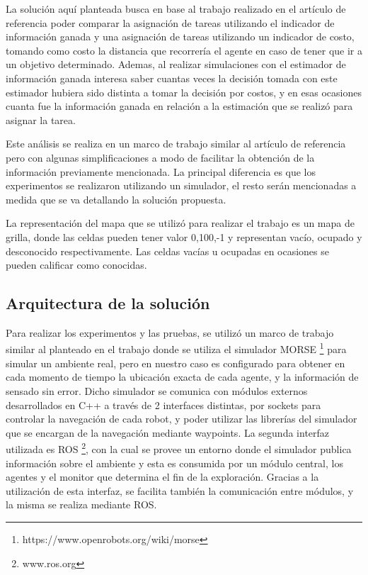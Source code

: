 \documentclass[runningheads]{llncs}
\begin{document}
La solución aquí planteada busca en base al trabajo realizado en el artículo de referencia poder comparar la asignación de tareas utilizando el indicador de información ganada y una asignación de tareas utilizando un indicador de costo, tomando como costo la distancia que recorrería el agente en caso de tener que ir a un objetivo determinado. Ademas, al realizar simulaciones con el estimador de información ganada interesa saber cuantas veces la decisión tomada con este estimador hubiera sido distinta a tomar la decisión por costos, y en esas ocasiones cuanta fue la información ganada en relación a la estimación que se realizó para asignar la tarea.

Este análisis se realiza en un marco de trabajo similar al artículo de referencia pero con algunas simplificaciones a modo de facilitar la obtención de la información previamente mencionada. La principal diferencia es que los experimentos se realizaron utilizando un simulador, el resto serán mencionadas a medida que se va detallando la solución propuesta.

La representación del mapa que se utilizó para realizar el trabajo es un mapa de grilla, donde las celdas pueden tener valor 0,100,-1 y representan vacío, ocupado y desconocido respectivamente. Las celdas vacías u ocupadas en ocasiones se pueden calificar como conocidas.

\subsection{Arquitectura de la solución}

Para realizar los experimentos y las pruebas, se utilizó un marco de trabajo similar al planteado en el trabajo \cite{metricas} donde se utiliza el simulador MORSE \footnote{https://www.openrobots.org/wiki/morse} para simular un ambiente real, pero en nuestro caso es configurado para obtener en cada momento de tiempo la ubicación exacta de cada agente, y la información de sensado sin error. Dicho simulador se comunica con módulos externos desarrollados en C++ a través de 2 interfaces distintas, por sockets para controlar la navegación de cada robot, y poder utilizar las librerías del simulador que se encargan de la navegación mediante waypoints. La segunda interfaz utilizada es ROS \footnote{www.ros.org}, con la cual se provee un entorno donde el simulador publica información sobre el ambiente y esta es consumida por un módulo central, los agentes y el monitor que determina el fin de la exploración.  Gracias a la utilización de esta interfaz, se facilita también la comunicación entre módulos, y la misma se realiza mediante ROS. 
\end{document}
